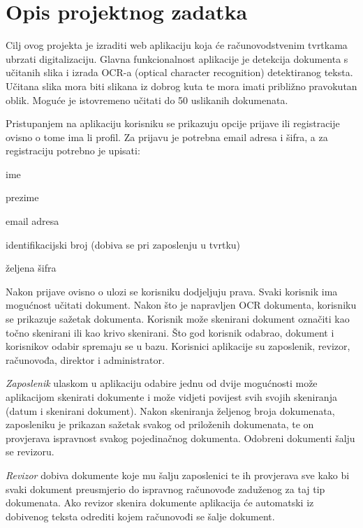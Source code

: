 \chapter{Opis projektnog zadatka}
		
		Cilj ovog projekta je izraditi web aplikaciju koja će 
		računovodstvenim tvrtkama ubrzati digitalizaciju. Glavna funkcionalnost aplikacije je detekcija dokumenta
		s učitanih slika i izrada OCR-a (optical character recognition) detektiranog teksta. Učitana slika mora biti slikana iz dobrog kuta te mora imati približno pravokutan oblik. Moguće je istovremeno učitati do 50 uslikanih dokumenata.
		
		Pristupanjem na aplikaciju korisniku se prikazuju opcije prijave ili registracije ovisno o tome ima li profil. Za prijavu je potrebna email adresa i šifra, a za registraciju  potrebno je upisati:
		\begin{packed_item}
			\item {ime}
			\item {prezime}
			\item {email adresa}
			\item {identifikacijski broj (dobiva se pri zaposlenju u tvrtku)}
			\item {željena šifra}
		\end{packed_item}
		
		Nakon prijave ovisno o ulozi se korisniku dodjeljuju prava. Svaki korisnik ima mogućnost učitati dokument. Nakon što je napravljen OCR dokumenta, korisniku se prikazuje sažetak dokumenta. Korisnik može skenirani dokument označiti kao točno skenirani ili kao krivo skenirani. Što god korisnik odabrao, dokument i korisnikov odabir spremaju se u bazu.	Korisnici aplikacije su zaposlenik, revizor, računovođa, direktor i administrator.
		
		\textit {Zaposlenik} ulaskom u aplikaciju odabire jednu od dvije mogućnosti može aplikacijom skenirati dokumente i može vidjeti povijest svih svojih skeniranja (datum i skenirani dokument). Nakon skeniranja željenog broja dokumenata, zaposleniku je prikazan sažetak svakog od priloženih dokumenata, te on provjerava ispravnost svakog pojedinačnog dokumenta. Odobreni dokumenti šalju se revizoru. 
		
		\textit{Revizor} dobiva dokumente koje mu šalju zaposlenici te ih provjerava sve kako bi svaki dokument preusmjerio do ispravnog računovođe zaduženog za taj tip dokumenata. Ako revizor skenira dokumente aplikacija će automatski iz dobivenog teksta odrediti kojem računovođi se šalje dokument.
		
